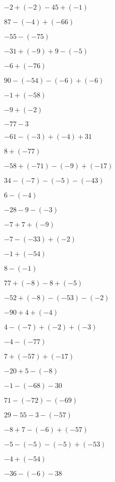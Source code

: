 {{\item$\num{-2} + (\num{-2}) - \num{45} + (\num{-1})$  \item$\num{87} - (\num{-4}) + (\num{-66})$  \item$\num{-55} - (\num{-75})$

\item$\num{-31} + (\num{-9}) + \num{9} - (\num{-5})$  \item$\num{-6} + (\num{-76})$  \item$\num{90} - (\num{-54}) - (\num{-6}) + (\num{-6})$

\item$\num{-1} + (\num{-58})$  \item$\num{-9} + (\num{-2})$  \item$\num{-77} - \num{3}$

\item$\num{-61} - (\num{-3}) + (\num{-4}) + \num{31}$  \item$\num{8} + (\num{-77})$  \item$\num{-58} + (\num{-71}) - (\num{-9}) + (\num{-17})$

\item$\num{34} - (\num{-7}) - (\num{-5}) - (\num{-43})$  \item$\num{6} - (\num{-4})$  \item$\num{-28} - \num{9} - (\num{-3})$

\item$\num{-7} + \num{7} + (\num{-9})$  \item$\num{-7} - (\num{-33}) + (\num{-2})$  \item$\num{-1} + (\num{-54})$

\item$\num{8} - (\num{-1})$  \item$\num{77} + (\num{-8}) - \num{8} + (\num{-5})$  \item$\num{-52} + (\num{-8}) - (\num{-53}) - (\num{-2})$

\item$\num{-90} + \num{4} + (\num{-4})$  \item$\num{4} - (\num{-7}) + (\num{-2}) + (\num{-3})$  \item$\num{-4} - (\num{-77})$

\item$\num{7} + (\num{-57}) + (\num{-17})$  \item$\num{-20} + \num{5} - (\num{-8})$  \item$\num{-1} - (\num{-68}) - \num{30}$

\item$\num{71} - (\num{-72}) - (\num{-69})$  \item$\num{29} - \num{55} - \num{3} - (\num{-57})$  \item$\num{-8} + \num{7} - (\num{-6}) + (\num{-57})$

\item$\num{-5} - (\num{-5}) - (\num{-5}) + (\num{-53})$  \item$\num{-4} + (\num{-54})$  \item$\num{-36} - (\num{-6}) - \num{38}$

}}

